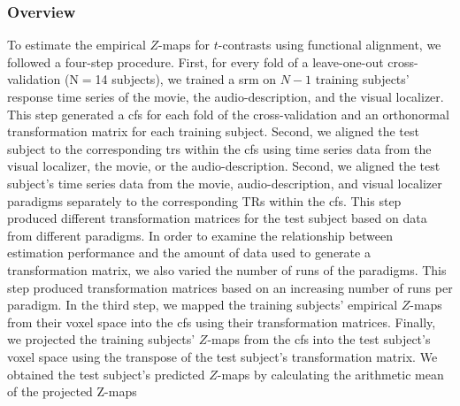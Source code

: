 \subsubsection{Overview}
%
To estimate the empirical $Z$-maps for $t$-contrasts using functional alignment,
we followed a four-step procedure.
First, for every fold of a leave-one-out cross-validation (N$=$14 subjects), we
trained a \ac{srm} on $N-1$ training subjects' response time series of the
movie, the audio-description, and the visual localizer.
This step generated a \ac{cfs} for each fold of the cross-validation and an
orthonormal transformation matrix for each training subject.
Second, we aligned the test subject to the corresponding \acp{tr} within the
\ac{cfs} using time series data from the visual localizer, the movie, or the
audio-description.
%
Second, we aligned the test subject's time series data from the movie,
audio-description, and visual localizer paradigms separately to the
corresponding TRs within the \ac{cfs}.
%
This step produced different transformation matrices for the test subject based
on data from different paradigms.
In order to examine the relationship between estimation performance and the
amount of data used to generate a transformation matrix, we also varied the
number of runs of the paradigms.
%
This step produced transformation matrices based on an increasing number of runs
per paradigm.
%
In the third step, we mapped the training subjects' empirical $Z$-maps from
their voxel space into the \ac{cfs} using their transformation matrices.
Finally, we projected the training subjects' $Z$-maps from the \ac{cfs} into the
test subject's voxel space using the transpose of the test subject's
transformation matrix.
We obtained the test subject's predicted $Z$-maps by calculating the arithmetic
mean of the projected Z-maps



